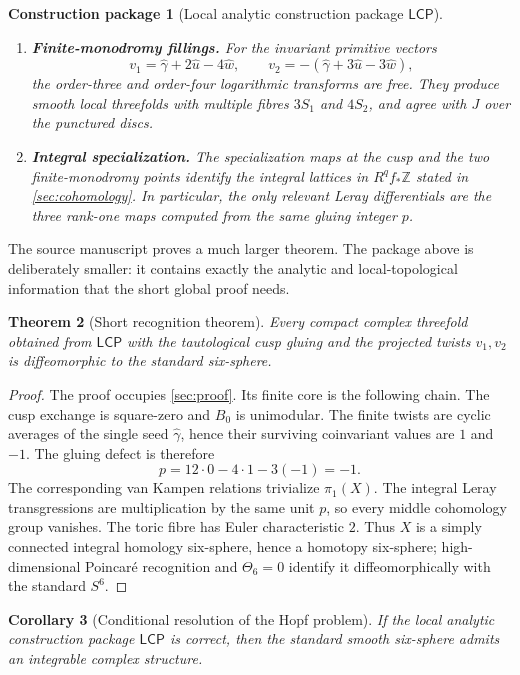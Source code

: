 \documentclass[11pt,reqno]{amsart}
\numberwithin{equation}{section}
\newcommand{\Z}{\mathbb Z}
\newcommand{\wideg}{\widehat\gamma}
\newcommand{\wideu}{\widehat u}
\newcommand{\widew}{\widehat w}
\newcommand{\LCP}{\mathsf{LCP}}
\newtheorem{theorem}{Theorem}[section]
\newtheorem{corollary}[theorem]{Corollary}
\newtheorem{construction}[theorem]{Construction package}
\theoremstyle{definition}
\begin{document}
\begin{construction}[Local analytic construction package $\LCP$]
\begin{enumerate}[label=\textup{(L\arabic*)}]
\item \textbf{Finite-monodromy fillings.} For the invariant primitive vectors
\[
 v_1=\wideg+2\wideu-4\widew,
 \qquad
 v_2=-(\wideg+3\wideu-3\widew),
\]
the order-three and order-four logarithmic transforms are free. They produce smooth local threefolds with multiple fibres $3S_1$ and $4S_2$, and agree with $J$ over the punctured discs.

\item \textbf{Integral specialization.} The specialization maps at the cusp and the two finite-monodromy points identify the integral lattices in $R^qf_*\Z$ stated in \cref{sec:cohomology}. In particular, the only relevant Leray differentials are the three rank-one maps computed from the same gluing integer $p$.
\end{enumerate}
\end{construction}

The source manuscript proves a much larger theorem. The package above is deliberately smaller: it contains exactly the analytic and local-topological information that the short global proof needs.

\begin{theorem}[Short recognition theorem]\label{thm:main}
Every compact complex threefold obtained from $\LCP$ with the tautological cusp gluing and the projected twists $v_1,v_2$ is diffeomorphic to the standard six-sphere.
\end{theorem}

\begin{proof}
The proof occupies \cref{sec:proof}. Its finite core is the following chain.
The cusp exchange is square-zero and $B_0$ is unimodular. The finite twists are cyclic averages of the single seed $\wideg$, hence their surviving coinvariant values are $1$ and $-1$. The gluing defect is therefore
\[
 p=12\cdot0-4\cdot1-3(-1)=-1.
\]
The corresponding van Kampen relations trivialize $\pi_1(X)$. The integral Leray transgressions are multiplication by the same unit $p$, so every middle cohomology group vanishes. The toric fibre has Euler characteristic $2$. Thus $X$ is a simply connected integral homology six-sphere, hence a homotopy six-sphere; high-dimensional Poincar\'e recognition and $\Theta_6=0$ identify it diffeomorphically with the standard $S^6$.
\end{proof}

\begin{corollary}[Conditional resolution of the Hopf problem]\label{cor:conditional}
If the local analytic construction package $\LCP$ is correct, then the standard smooth six-sphere admits an integrable complex structure.
\end{corollary}
\end{document}
